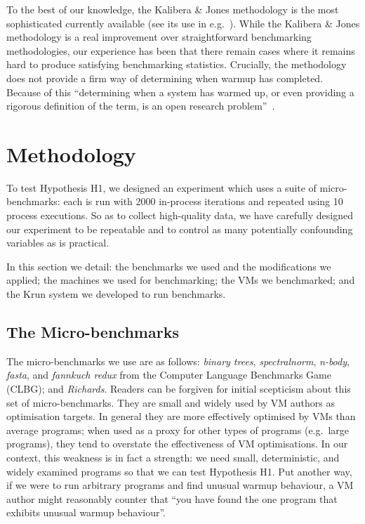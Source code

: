 \documentclass[a4paper,UKenglish]{lipics}
\newcommand{\kalibera}{Kalibera \& Jones\xspace}
\newcommand{\krun}{Krun\xspace}
\newcommand{\hypone}{H1\xspace}
\newcommand{\binarytrees}{\emph{binary trees}\xspace}
\newcommand{\richards}{\emph{Richards}\xspace}
\newcommand{\spectralnorm}{\emph{spectralnorm}\xspace}
\newcommand{\nbody}{\emph{n-body}\xspace}
\newcommand{\fasta}{\emph{fasta}\xspace}
\newcommand{\fannkuch}{\emph{fannkuch redux}\xspace}
\begin{document}
To the best of our knowledge, the \kalibera methodology is the most
sophisticated currently available (see its use in
e.g.~\cite{barrett15approaches,grimmer15dynamically}). While the \kalibera
methodology is a real improvement over straightforward benchmarking methodologies,
our experience has been that there remain cases where it remains hard to produce
satisfying benchmarking statistics. Crucially, the methodology does not
provide a firm way of determining when warmup has completed. Because of this
``determining when a system has warmed up, or even providing a
rigorous definition of the term, is an open research problem''~\cite{seaton15phd}.


\section{Methodology}
\label{sec:methodology}

To test Hypothesis H1, we designed an experiment which uses a suite of
micro-benchmarks: each is run with 2000 in-process iterations and repeated
using 10 process executions. So as
to collect high-quality data, we have carefully designed our
experiment to be repeatable and to control as many potentially confounding variables as
is practical.

In this section we detail: the benchmarks we used and the modifications we
applied; the machines we used for benchmarking; the VMs we benchmarked; and the
\krun system we developed to run benchmarks.


\subsection{The Micro-benchmarks}

The micro-benchmarks we use are as follows: \binarytrees, \spectralnorm, \nbody,
\fasta, and \fannkuch from the Computer Language Benchmarks Game (CLBG); and
\richards. Readers can be forgiven for initial scepticism about this set of micro-benchmarks.
They are small and widely
used by VM authors as optimisation targets. In general they are more effectively
optimised by VMs than average programs; when used as a proxy for other types
of programs (e.g.~large programs), they tend to overstate the effectiveness of
VM optimisations. In our context, this weakness is in fact a strength: we need
small, deterministic, and widely examined programs so that we can test
Hypothesis \hypone. Put another way, if we were to run arbitrary programs
and find unusual warmup behaviour, a VM author might reasonably counter that
``you have found the one program that exhibits unusual warmup behaviour''.
\end{document}
